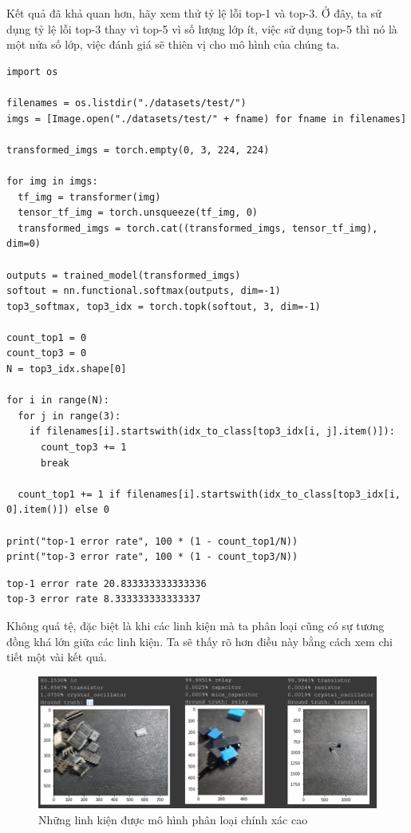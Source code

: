 \documentclass[a4paper]{article}
\begin{document}
\noindent
Kết quả đã khả quan hơn, hãy xem thử tỷ lệ lỗi top-1 và top-3. Ở đây, ta sử dụng tỷ lệ lỗi top-3 thay vì top-5 vì số lượng lớp ít, việc sử dụng top-5 thì nó là một nửa số lớp, việc đánh giá sẽ thiên vị cho mô hình của chúng ta.
\begin{lstlisting}
import os

filenames = os.listdir("./datasets/test/")
imgs = [Image.open("./datasets/test/" + fname) for fname in filenames]

transformed_imgs = torch.empty(0, 3, 224, 224)

for img in imgs:
  tf_img = transformer(img)
  tensor_tf_img = torch.unsqueeze(tf_img, 0)
  transformed_imgs = torch.cat((transformed_imgs, tensor_tf_img), dim=0)

outputs = trained_model(transformed_imgs)
softout = nn.functional.softmax(outputs, dim=-1)
top3_softmax, top3_idx = torch.topk(softout, 3, dim=-1)

count_top1 = 0
count_top3 = 0
N = top3_idx.shape[0]

for i in range(N):
  for j in range(3):
    if filenames[i].startswith(idx_to_class[top3_idx[i, j].item()]):
      count_top3 += 1
      break

  count_top1 += 1 if filenames[i].startswith(idx_to_class[top3_idx[i, 0].item()]) else 0

print("top-1 error rate", 100 * (1 - count_top1/N))
print("top-3 error rate", 100 * (1 - count_top3/N))
\end{lstlisting}
\begin{verbatim}
top-1 error rate 20.833333333333336
top-3 error rate 8.333333333333337
\end{verbatim}
Không quá tệ, đặc biệt là khi các linh kiện mà ta phân loại cũng có sự tương đồng khá lớn giữa các linh kiện. Ta sẽ thấy rõ hơn điều này bằng cách xem chi tiết một vài kết quả.
\newpage
\begin{figure}[h!]
\centering
\includegraphics[width=15cm]{images/result1.PNG}
\caption*{Những linh kiện được mô hình phân loại chính xác cao}
\end{figure}
\end{document}
